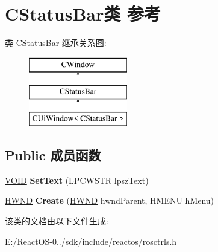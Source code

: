 \hypertarget{class_c_status_bar}{}\section{C\+Status\+Bar类 参考}
\label{class_c_status_bar}
类 C\+Status\+Bar 继承关系图\+:\begin{figure}[H]
\begin{center}
\leavevmode
\includegraphics[height=3.000000cm]{class_c_status_bar}
\end{center}
\end{figure}
\subsection*{Public 成员函数}
\begin{DoxyCompactItemize}
\item 
\mbox{\label{class_c_status_bar_a99a087d4ccece7a8fd2966c2f7c03e50}} 
\hyperlink{interfacevoid}{V\+O\+ID} {\bfseries Set\+Text} (L\+P\+C\+W\+S\+TR lpsz\+Text)
\item 
\mbox{\label{class_c_status_bar_ac090d0c05e4b7893570f4371fc5028ee}} 
\hyperlink{interfacevoid}{H\+W\+ND} {\bfseries Create} (\hyperlink{interfacevoid}{H\+W\+ND} hwnd\+Parent, H\+M\+E\+NU h\+Menu)
\end{DoxyCompactItemize}


该类的文档由以下文件生成\+:\begin{DoxyCompactItemize}
\item 
E\+:/\+React\+O\+S-\/0../sdk/include/reactos/rosctrls.\+h\end{DoxyCompactItemize}
